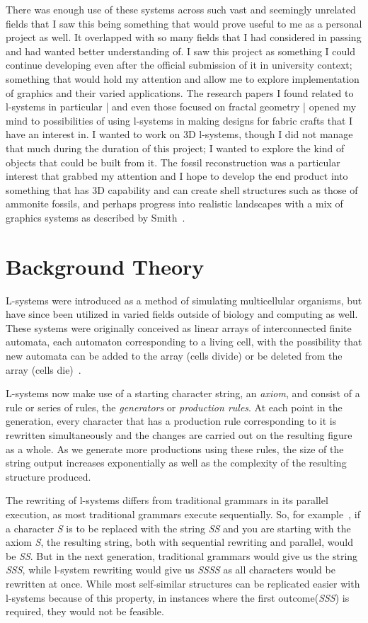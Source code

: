 \documentclass[]{final_report}
\begin{document}
There was enough use of these systems across such vast and seemingly unrelated fields that I saw this being something that would prove useful to me as a personal project as well. It overlapped with so many fields that I had considered in passing and had wanted better understanding of. I saw this project as something I could continue developing even after the official submission of it in university context; something that would hold my attention and allow me to explore implementation of graphics and their varied applications. The research papers I found related to l-systems in particular | and even those focused on fractal geometry | opened my mind to possibilities of using l-systems in making designs for fabric crafts that I have an interest in. I wanted to work on 3D l-systems, though I did not manage that much during the duration of this project; I wanted to explore the kind of objects that could be built from it. The fossil reconstruction was a particular interest that grabbed my attention and I hope to develop the end product into something that has 3D capability  and can create shell structures such as those of ammonite fossils, and perhaps progress into realistic landscapes with a mix of graphics systems as described by Smith~\cite{ARS:1984}.

\chapter{Background Theory}

L-systems were introduced as a method of simulating multicellular organisms, but have since been utilized in varied fields outside of biology and computing as well. These systems were originally conceived as linear arrays of interconnected finite automata, each automaton corresponding to a living cell, with the possibility that new automata can be added to the array (cells divide) or be deleted from the array (cells die)~\cite{LIN:1972}. 

L-systems now make use of a starting character string, an \emph{axiom}, and consist of a rule or series of rules, the \emph{generators} or \emph{production rules}. At each point in the generation, every character that has a production rule corresponding to it is rewritten simultaneously and the changes are carried out on the resulting figure as a whole. As we generate more productions using these rules, the size of the string output increases exponentially as well as the complexity of the resulting structure produced.

The rewriting of l-systems differs from traditional grammars in its parallel execution, as most traditional grammars execute sequentially. So, for example~\cite{ROZ:1974}, if a character \textit{S} is to be replaced with the string \textit{SS} and you are starting with the axiom \textit{S}, the resulting string, both with sequential rewriting and parallel, would be \textit{SS}. But in the next generation, traditional grammars would give us the string \textit{SSS}, while l-system rewriting would give us \textit{SSSS} as all characters would be rewritten at once. While most self-similar structures can be replicated easier with l-systems because of this property, in instances where the first outcome(\textit{SSS}) is required, they would not be feasible.
\end{document}
